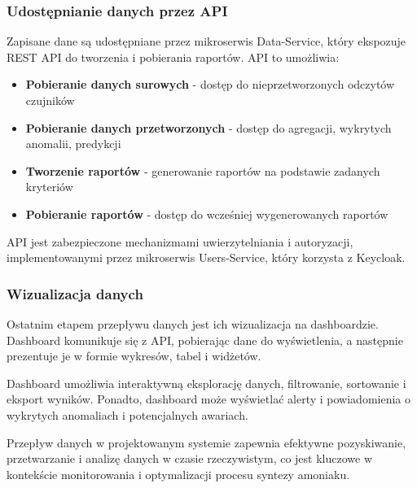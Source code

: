 \subsubsection{Udostępnianie danych przez API}
\label{subsubsec:udostepnianie_danych}

Zapisane dane są udostępniane przez mikroserwis Data-Service, który ekspozuje REST API do tworzenia i pobierania raportów. API to umożliwia:

\begin{itemize}
    \item \textbf{Pobieranie danych surowych} - dostęp do nieprzetworzonych odczytów czujników
    \item \textbf{Pobieranie danych przetworzonych} - dostęp do agregacji, wykrytych anomalii, predykcji
    \item \textbf{Tworzenie raportów} - generowanie raportów na podstawie zadanych kryteriów
    \item \textbf{Pobieranie raportów} - dostęp do wcześniej wygenerowanych raportów
\end{itemize}

API jest zabezpieczone mechanizmami uwierzytelniania i autoryzacji, implementowanymi przez mikroserwis Users-Service, który korzysta z Keycloak.

\subsubsection{Wizualizacja danych}
\label{subsubsec:wizualizacja_danych}

Ostatnim etapem przepływu danych jest ich wizualizacja na dashboardzie. Dashboard komunikuje się z API, pobierając dane do wyświetlenia, a następnie prezentuje je w formie wykresów, tabel i widżetów.

Dashboard umożliwia interaktywną eksplorację danych, filtrowanie, sortowanie i eksport wyników. Ponadto, dashboard może wyświetlać alerty i powiadomienia o wykrytych anomaliach i potencjalnych awariach.

Przepływ danych w projektowanym systemie zapewnia efektywne pozyskiwanie, przetwarzanie i analizę danych w czasie rzeczywistym, co jest kluczowe w kontekście monitorowania i optymalizacji procesu syntezy amoniaku. 